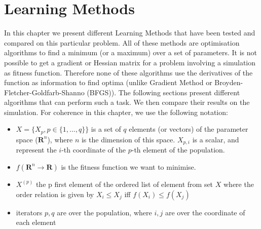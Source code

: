 
\chapter{Learning Methods} %

\label{Chapter 4} %


In this chapter we present different Learning Methods that have been tested and compared on this particular problem. All of these methods are optimisation algorithms to find a minimum (or a maximum) over a set of parameters. It is not possible to get a gradient or Hessian matrix for a problem involving a simulation as fitness function. Therefore none of these algorithms use the derivatives of the function as information to find optima (unlike Gradient Method or Broyden-Fletcher-Goldfarb-Shanno (BFGS)). The following sections present different algorithms that can perform such a task. We then compare their results on the simulation. For coherence in this chapter, we use the following notation: 

\begin{itemize}
    \item $X = \{ X_p, p\in{\{1, ..., q\}}\} $ is a set of $q$ elements (or vectors) of the parameter space ($\mathbf{R}^ n $), where $n$ is the dimension of this space. $X_{p,i}$ is a scalar, and represent the $i$-th coordinate of the $p$-th element of the population.
    \item $f (\mathbf{R} ^ n \to \mathbf{R})$ is the fitness function we want to minimise.
    \item $X^{(p)}$ the p first element of the ordered list of element from set $X$ where the order relation is given by $X_i \leq X_j$ iff $f(X_i) \leq f(X_j)$
    \item iterators $p, q$ are over the population, where $i, j$ are over the coordinate of each element  
\end{itemize}

